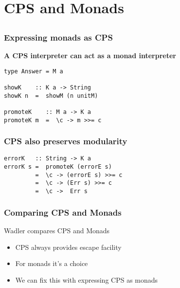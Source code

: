 \documentclass{beamer}
\begin{document}
\section{CPS and Monads}
\subsection{}
\begin{frame}[fragile]
\frametitle{Expressing monads as CPS}
\textbf{A CPS interpreter can act as a monad interpreter}
\begin{lstlisting}
type Answer = M a

showK    :: K a -> String
showK n  =  showM (n unitM)

promoteK    :: M a -> K a
promoteK m  =  \c -> m >>= c
\end{lstlisting}


\end{frame}


\begin{frame}[fragile]
\frametitle{CPS also preserves modularity}
\begin{lstlisting}
errorK   :: String -> K a
errorK s =  promoteK (errorE s)
         =  \c -> (errorE s) >>= c
         =  \c -> (Err s) >>= c
         =  \c ->  Err s
\end{lstlisting}

\end{frame}


\begin{frame}[fragile]
\frametitle{Comparing CPS and Monads}
Wadler compares CPS and Monads
\begin{itemize}
\item CPS always provides escape facility
\item For monads it's a choice
\item We can fix this with expressing CPS as monads
\end{itemize}
\end{frame}
\end{document}
